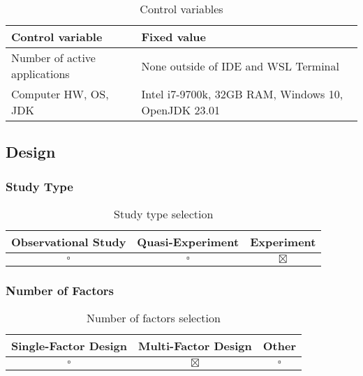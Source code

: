 \documentclass{article}
\begin{document}
\begin{table}[h!]
    \centering
    \begin{tabular}{l|l}
        \textbf{Control variable}     & \textbf{Fixed value}                                \\ \hline
        Number of active applications & None outside of IDE and WSL Terminal                \\
        Computer HW, OS, JDK          & Intel i7-9700k, 32GB RAM, Windows 10, OpenJDK 23.01 \\
    \end{tabular}
    \caption{Control variables}
\end{table}

\FloatBarrier

\subsection{Design}
\subsubsection{Study Type}

\begin{table}[!h]
    \centering
    \begin{tabular}{c|c|c}
        \textbf{Observational Study} & \textbf{Quasi-Experiment} & \textbf{Experiment} \\ \hline
        \(\square\)                  & \(\square\)               & \(\boxtimes\)       \\
    \end{tabular}
    \caption{Study type selection}
\end{table}



\subsubsection{Number of Factors}
\begin{table}[!h]
    \centering
    \begin{tabular}{c|c|c}
        \textbf{Single-Factor Design} & \textbf{Multi-Factor Design} & \textbf{Other} \\ \hline
        \(\square\)                   & \(\boxtimes\)                & \(\square\)    \\
    \end{tabular}
    \caption{Number of factors selection}
\end{table}
\end{document}
